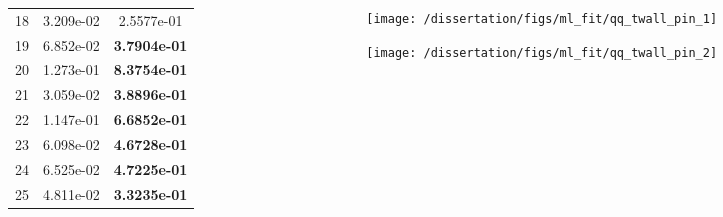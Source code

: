 \documentclass[t, pdftex]{beamer}
\begin{document}
\begin{frame}
\begin{columns}
\begin{column}{0.5\textwidth}
\begin{table}[h]
\begin{center}
\begin{tabular}[h]{|c|c|c|}
            18 & 3.209e-02 & 2.5577e-01 \\
            19 & 6.852e-02 &\textbf{ 3.7904e-01} \\
            20 & 1.273e-01 &\textbf{ 8.3754e-01} \\
            21 & 3.059e-02 &\textbf{ 3.8896e-01} \\
            22 & 1.147e-01 &\textbf{ 6.6852e-01} \\
            23 & 6.098e-02 &\textbf{ 4.6728e-01} \\
            24 & 6.525e-02 &\textbf{ 4.7225e-01} \\
            25 & 4.811e-02 & \textbf{ 3.3235e-01} \\
            \hline
        \end{tabular}
        \label{tab:ks_temp}
    \end{center}
\end{table}
    \end{column}
    \begin{column}{0.5\textwidth}
        \begin{figure}[H]%
            \texttt{[image: /dissertation/figs/ml\_fit/qq\_twall\_pin\_1]}
        \end{figure}
        \vspace{-26pt}
        \begin{figure}[H]%
            \texttt{[image: /dissertation/figs/ml\_fit/qq\_twall\_pin\_2]}
        \end{figure}
    \end{column}
\end{columns}
\end{frame}

\end{document}
